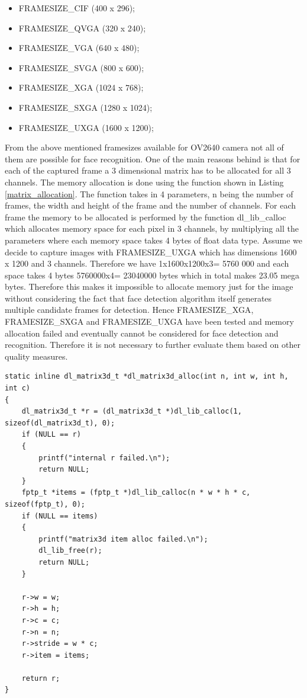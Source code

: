 \begin{itemize}
    \item FRAMESIZE\_CIF (400 x 296);
    \item FRAMESIZE\_QVGA (320 x 240);
    \item FRAMESIZE\_VGA (640 x 480);
    \item FRAMESIZE\_SVGA (800 x 600);
    \item FRAMESIZE\_XGA (1024 x 768);
    \item FRAMESIZE\_SXGA (1280 x 1024);
    \item FRAMESIZE\_UXGA (1600 x 1200);
\end{itemize}
From the above mentioned framesizes available for OV2640 camera not all of them are possible for face recognition. One of the main reasons behind is that for each of the captured frame a 3 dimensional matrix has to be allocated for all 3 channels. The memory allocation is done using the function shown in Listing \ref{matrix_allocation}. The function takes in 4 parameters, n being the number of frames, the width and height of the frame and the number of channels. For each frame the memory to be allocated is performed by the function {\selectfont dl\_lib\_calloc} which allocates memory space for each pixel in 3 channels, by multiplying all the parameters where each memory space takes 4 bytes of float data type. Assume we decide to capture images with  {\selectfont FRAMESIZE\_UXGA} which has dimensions 1600 x 1200 and 3 channels. Therefore we have 1x1600x1200x3= 5760 000 and each space takes 4 bytes 5760000x4= 23040000 bytes which in total makes 23.05 mega bytes. Therefore this makes it impossible to allocate memory just for the image without considering the fact that face detection algorithm itself generates multiple candidate frames for detection. Hence {\selectfont FRAMESIZE\_XGA}, {\selectfont FRAMESIZE\_SXGA} and {\selectfont FRAMESIZE\_UXGA} have been tested and memory allocation failed and eventually cannot be considered for face detection and recognition. Therefore it is not necessary to further evaluate them based on other quality measures. 

\begin{lstlisting}[caption={Allocating memory for three dimensional matrix.},label=matrix_allocation, captionpos=b]
static inline dl_matrix3d_t *dl_matrix3d_alloc(int n, int w, int h, int c)
{
    dl_matrix3d_t *r = (dl_matrix3d_t *)dl_lib_calloc(1, sizeof(dl_matrix3d_t), 0);
    if (NULL == r)
    {
        printf("internal r failed.\n");
        return NULL;
    }
    fptp_t *items = (fptp_t *)dl_lib_calloc(n * w * h * c, sizeof(fptp_t), 0);
    if (NULL == items)
    {
        printf("matrix3d item alloc failed.\n");
        dl_lib_free(r);
        return NULL;
    }

    r->w = w;
    r->h = h;
    r->c = c;
    r->n = n;
    r->stride = w * c;
    r->item = items;

    return r;
}
\end{lstlisting}

